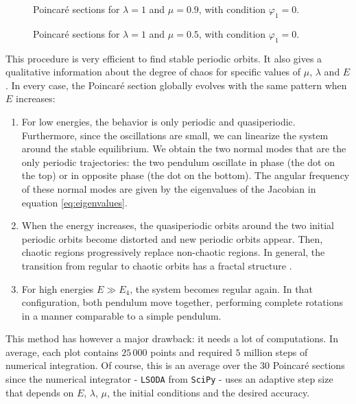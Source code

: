 \documentclass[11 pt]{article}
\begin{document}
\begin{figure}[H]
    \centering
    
    \caption{Poincaré sections for $\lambda=1$ and $\mu=0.9$, with condition $\varphi_1=0$.}
    \label{fig:section_4}
\end{figure}

\begin{figure}[H]
    \centering
    
    \caption{Poincaré sections for $\lambda=1$ and $\mu=0.5$, with condition $\varphi_1=0$.}
    \label{fig:section_5}
\end{figure}

This procedure is very efficient to find stable periodic orbits. It also gives a qualitative information about the degree of chaos for specific values of $\mu$, $\lambda$ and $E$. In every case, the Poincaré section globally evolves with the same pattern when $E$ increases:
\begin{enumerate}
    \item For low energies, the behavior is only periodic and quasiperiodic. Furthermore, since the oscillations are small, we can linearize the system around the stable equilibrium. We obtain the two normal modes that are the only periodic trajectories: the two pendulum oscillate in phase (the dot on the top) or in opposite phase (the dot on the bottom). The angular frequency of these normal modes are given by the eigenvalues of the Jacobian in equation \eqref{eq:eigenvalues}.
    \item When the energy increases, the quasiperiodic orbits around the two initial periodic orbits become distorted and new periodic orbits appear. Then, chaotic regions  progressively replace non-chaotic regions. In general, the transition from regular to chaotic orbits has a fractal structure \cite{ChaosPC}.
    \item For high energies $E \gg E_4$, the system becomes regular again. In that configuration, both pendulum move together, performing complete rotations in a manner comparable to a simple pendulum.
\end{enumerate}

This method has however a major drawback: it needs a lot of computations. In average, each plot contains $25\,000$ points and required $5$ million steps of numerical integration. Of course, this is an average over the $30$ Poincaré sections since the numerical integrator - \texttt{LSODA} from \texttt{SciPy} - uses an adaptive step size that depends on $E$, $\lambda$, $\mu$, the initial conditions and the desired accuracy.
\end{document}
